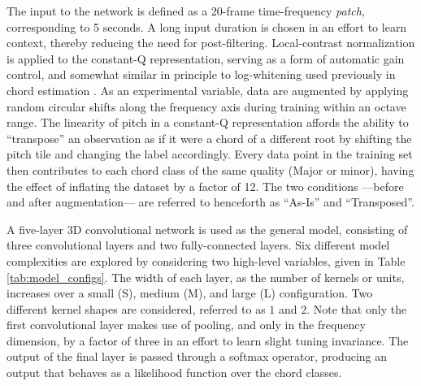 The input to the network is defined as a 20-frame time-frequency \emph{patch}, corresponding to 5 seconds.
A long input duration is chosen in an effort to learn context, thereby reducing the need for post-filtering.
Local-contrast normalization is applied to the constant-Q representation, serving as a form of automatic gain control, and somewhat similar in principle to log-whitening used previously in chord estimation \cite{Cho2011}.
As an experimental variable, data are augmented by applying random circular shifts along the frequency axis during training within an octave range.
The linearity of pitch in a constant-Q representation affords the ability to ``transpose'' an observation as if it were a chord of a different root by shifting the pitch tile and changing the label accordingly.
Every data point in the training set then contributes to each chord class of the same quality (Major or minor), having the effect of inflating the dataset by a factor of 12.
The two conditions ---before and after augmentation--- are referred to henceforth as ``As-Is'' and ``Transposed''.

A five-layer 3D convolutional network is used as the general model, consisting of three convolutional layers and two fully-connected layers. %
Six different model complexities are explored by considering two high-level variables, given in Table \ref{tab:model_configs}.
The width of each layer, as the number of kernels or units, increases over a small (S), medium (M), and large (L) configuration.
Two different kernel shapes are considered, referred to as $1$ and $2$.
Note that only the first convolutional layer makes use of pooling, and only in the frequency dimension, by a factor of three in an effort to learn slight tuning invariance.
The output of the final layer is passed through a softmax operator, producing an output that behaves as a likelihood function over the chord classes.


